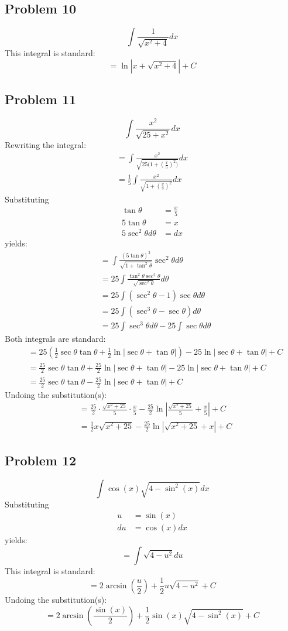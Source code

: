 \documentclass{article}
\begin{document}
\subsection*{Problem 10}
$$\int\frac{1}{\sqrt{x^2+4}}dx$$
This integral is standard:
$$=\ln\left|x+\sqrt{x^2+4}\right|+C$$
\subsection*{Problem 11}
$$\int\frac{x^2}{\sqrt{25+x^2}}dx$$
Rewriting the integral:
\begin{align*}
=\int\frac{x^2}{\sqrt{25\big(1+\left(\frac{x}{5}\right)^2\big)}}dx \\
=\frac{1}{5}\int\frac{x^2}{\sqrt{1+(\frac{x}{5})^2}}dx
\end{align*}
Substituting
\begin{align*}
\tan\theta&=\frac{x}{5} \\
5\tan\theta&=x \\
5\sec^2\theta d\theta&=dx
\end{align*}
yields:
\begin{align*}
&=\int\frac{(5\tan\theta)^2}{\sqrt{1+\tan^2\theta}}\sec^2\theta d\theta \\
&=25\int\frac{\tan^2\theta\sec^2\theta}{\sqrt{\sec^2\theta}}d\theta \\
&=25\int(\sec^2\theta-1)\sec\theta d\theta \\
&=25\int(\sec^3\theta-\sec\theta)d\theta \\
&=25\int\sec^3\theta d\theta-25\int\sec\theta d\theta
\end{align*}
Both integrals are standard:
\begin{align*}
&=25\left(\frac{1}{2}\sec\theta\tan\theta+\frac{1}{2}\ln|\sec\theta+\tan\theta|\right)-25\ln|\sec\theta+\tan\theta|+C \\
&=\frac{25}{2}\sec\theta\tan\theta+\frac{25}{2}\ln|\sec\theta+\tan\theta|-25\ln|\sec\theta+\tan\theta|+C \\
&=\frac{25}{2}\sec\theta\tan\theta-\frac{25}{2}\ln|\sec\theta+\tan\theta|+C
\end{align*}
Undoing the substitution(s):
\begin{align*}
&=\frac{25}{2}\cdot\frac{\sqrt{x^2+25}}{5}\cdot\frac{x}{5}-\frac{25}{2}\ln\left|\frac{\sqrt{x^2+25}}{5}+\frac{x}{5}\right|+C \\
&=\frac{1}{2}x\sqrt{x^2+25}-\frac{25}{2}\ln\left|\sqrt{x^2+25}+x\right|+C
\end{align*}
\subsection*{Problem 12}
$$\int\cos\left(x\right)\sqrt{4-\sin^2\left(x\right)}dx$$
Substituting
\begin{align*}
u&=\sin(x) \\
du&=\cos(x)dx
\end{align*}
yields:
$$=\int\sqrt{4-u^2}du$$
This integral is standard:
$$=2\arcsin\left(\frac{u}{2}\right)+\frac{1}{2}u\sqrt{4-u^2}+C$$
Undoing the substitution(s):
$$=2\arcsin\left(\frac{\sin(x)}{2}\right)+\frac{1}{2}\sin(x)\sqrt{4-\sin^2(x)}+C$$
\end{document}
